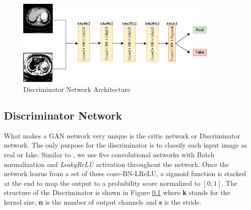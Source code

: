 \documentclass[journal]{IEEEtran}
\begin{document}
\begin{figure}[th!]
    \centering
    \includegraphics[width=10cm]{discriminator}
    \caption{Discriminator Network Architecture}
    \label{discriminator}
\end{figure}

\subsection{Discriminator Network}
\label{discriminator}
	What makes a GAN network very unique is the critic network or Discriminator network.  The only purpose for the discriminator is to classify each input image as real or fake.  Similar to \cite{alsaiari2019image}, we use five convolutional networks with Batch normalization and \emph{LeakyReLU} activation throughout the network.  Once the network learns from a set of these conv-BN-LReLU, a sigmoid function is stacked at the end to map the output to a probability score normalized to $[0,1]$.  The structure of the Discriminator is shown in Figure \ref{discriminator} where \textbf{k} stands for the kernel size, \textbf{n} is the number of output channels and \textbf{s} is the stride.

\end{document}
